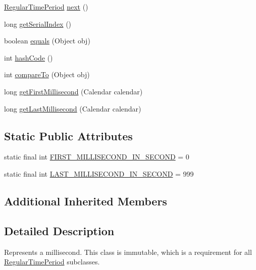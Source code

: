 \begin{DoxyCompactItemize}
\item 
\mbox{\hyperlink{classorg_1_1jfree_1_1data_1_1time_1_1_regular_time_period}{Regular\+Time\+Period}} \mbox{\hyperlink{classorg_1_1jfree_1_1data_1_1time_1_1_millisecond_ac88167e68af60951f52188df2dc69ccb}{next}} ()
\item 
long \mbox{\hyperlink{classorg_1_1jfree_1_1data_1_1time_1_1_millisecond_a767fcd80fcccffc307d4aa5c1a6637f9}{get\+Serial\+Index}} ()
\item 
boolean \mbox{\hyperlink{classorg_1_1jfree_1_1data_1_1time_1_1_millisecond_a1faa084fe97879d8ba56b68de91d2a24}{equals}} (Object obj)
\item 
int \mbox{\hyperlink{classorg_1_1jfree_1_1data_1_1time_1_1_millisecond_a9c8d1c89b9682ffc40d84de3f84f72ad}{hash\+Code}} ()
\item 
int \mbox{\hyperlink{classorg_1_1jfree_1_1data_1_1time_1_1_millisecond_a88be485734ecefa48fc024997679c152}{compare\+To}} (Object obj)
\item 
long \mbox{\hyperlink{classorg_1_1jfree_1_1data_1_1time_1_1_millisecond_ab5b4b79c1abe4d5dbf283b48ab24ec53}{get\+First\+Millisecond}} (Calendar calendar)
\item 
long \mbox{\hyperlink{classorg_1_1jfree_1_1data_1_1time_1_1_millisecond_ae7520d5a56fccdde166dfa162a0ff9e7}{get\+Last\+Millisecond}} (Calendar calendar)
\end{DoxyCompactItemize}
\subsection*{Static Public Attributes}
\begin{DoxyCompactItemize}
\item 
static final int \mbox{\hyperlink{classorg_1_1jfree_1_1data_1_1time_1_1_millisecond_ab1285d9183027e1d227210abbe521499}{F\+I\+R\+S\+T\+\_\+\+M\+I\+L\+L\+I\+S\+E\+C\+O\+N\+D\+\_\+\+I\+N\+\_\+\+S\+E\+C\+O\+ND}} = 0
\item 
static final int \mbox{\hyperlink{classorg_1_1jfree_1_1data_1_1time_1_1_millisecond_aebc94dc1b4d159c878c16c881c5d14f4}{L\+A\+S\+T\+\_\+\+M\+I\+L\+L\+I\+S\+E\+C\+O\+N\+D\+\_\+\+I\+N\+\_\+\+S\+E\+C\+O\+ND}} = 999
\end{DoxyCompactItemize}
\subsection*{Additional Inherited Members}


\subsection{Detailed Description}
Represents a millisecond. This class is immutable, which is a requirement for all \mbox{\hyperlink{classorg_1_1jfree_1_1data_1_1time_1_1_regular_time_period}{Regular\+Time\+Period}} subclasses. 

